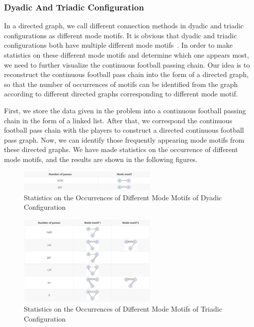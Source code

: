 \documentclass{mcmthesis}
\begin{document}
\subsubsection{Dyadic And Triadic Configuration}
	In a directed graph, we call different connection methods in dyadic and triadic configurations as different mode motifs.  It is obvious that dyadic and triadic configurations both have multiple different mode motifs~\cite{Second}.  In order to make statistics on these different mode motifs and determine which one appears most, we need to further visualize the continuous football passing chain.  Our idea is to reconstruct the continuous football pass chain into the form of a directed graph, so that the number of occurrences of motifs can be identified from the graph according to different directed graphs corresponding to different mode motif.

	First, we store the data given in the problem into a continuous football passing chain in the form of a linked list.  After that, we correspond the continuous football pass chain with the players to construct a directed continuous football pass graph.  Now, we can identify those frequently appearing mode motifs from these directed graphs.  We have made statistics on the occurrence of different mode motifs, and the results are shown in the following figures.

	\begin{figure}[h]
		\centering
		\includegraphics[width=0.6\textwidth]{figures/motif2.png}
		\caption{Statistics on the Occurrences of Different Mode Motifs of Dyadic Configuration}
		\label{fig:motif2}
	\end{figure}
	\begin{figure}[h]
		\centering
		\includegraphics[width=0.6\textwidth]{figures/motif3.png}
		\caption{Statistics on the Occurrences of Different Mode Motifs of Triadic Configuration}
		\label{fig:motif3}
	\end{figure}
	
\end{document}
